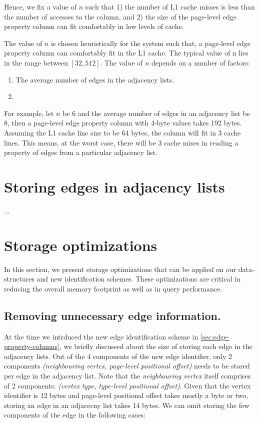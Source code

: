 Hence, we fix a value of $n$ such that 1) the number of L1 cache misses is less than the number of accesses to the column, and 2) the size of the page-level edge property column can fit comfortably in low levels of cache.

The value of $n$ is chosen heuristically for the system such that, a page-level edge property column can comfortably fit in the L1 cache. The typical value of n lies in the range between $[32, 512]$. The value of $n$ depends on a number of factors: 
\begin{enumerate}
	\item The average number of edges in the adjacency lists.
	\item  
\end{enumerate} 


For example, let $n$ be 6 and the average number of edges in an adjacency list be 8, then a page-level edge property column with 4-byte values takes 192 bytes. Assuming the L1 cache line size to be 64 bytes, the column will fit in 3 cache lines. This means, at the worst case, there will be 3 cache mises in reading a property of edges from a particular adjacency list.

\section{Storing edges in adjacency lists}
\label{sec:adjacency-lists}

...

\section{Storage optimizations}
\label{sec:storage-optimizations}

In this section, we present storage optimizations that can be applied on our data-structures and new identification schemes. These optimizations are critical in reducing the overall memory footprint as well as in query performance. 

\subsection{Removing unnecessary edge information.}

At the time we intrduced the new edge identification scheme in \ref{sec:edge-property-columns}, we briefly discussed about the size of storing each edge in the adjacency lists. Out of the 4 components of the new edge identifier, only 2 components \emph{(neighbouring vertex, page-level positional offset)} needs to be stored per edge in the adjacency list. Note that the \emph{neighbouring vertex} itself comprises of 2 components: \emph{(vertex type, type-level positional offset)}. Given that the vertex identifier is 12 bytes and page-level positional offset takes mostly a byte or two, storing an edge in an adjacecny list takes 14 bytes. We can omit storing the few components of the edge in the following cases: 

